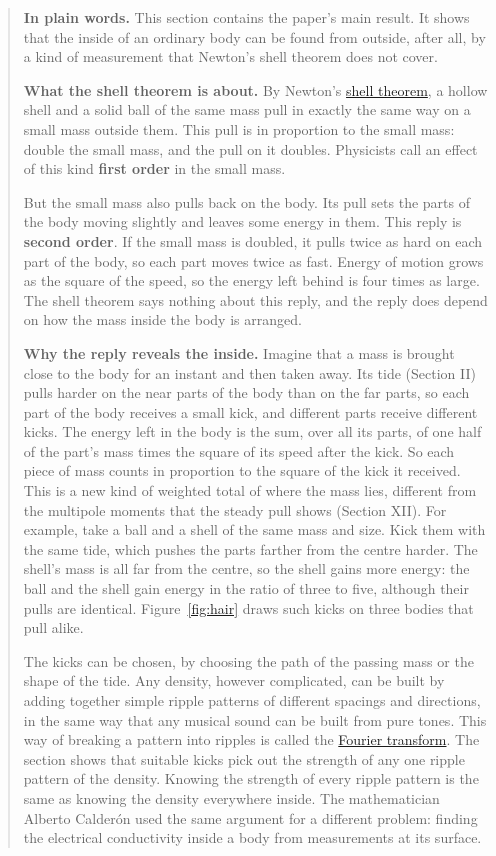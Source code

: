\begin{quote}
\textbf{In plain words.} This section contains the paper's main result. It shows
that the inside of an ordinary body can be found from outside, after all, by a
kind of measurement that Newton's shell theorem does not cover.

\textbf{What the shell theorem is about.} By Newton's
\href{https://en.wikipedia.org/wiki/Shell_theorem}{shell theorem}, a hollow
shell and a solid ball of the same mass pull in exactly the same way on a small
mass outside them. This pull is in proportion to the small mass: double the
small mass, and the pull on it doubles. Physicists call an effect of this kind
\textbf{first order} in the small mass.

But the small mass also pulls back on the body. Its pull sets the parts of the
body moving slightly and leaves some energy in them. This reply is
\textbf{second order}. If the small mass is doubled, it pulls twice as hard on
each part of the body, so each part moves twice as fast. Energy of motion grows
as the square of the speed, so the energy left behind is four times as large.
The shell theorem says nothing about this reply, and the reply does depend on
how the mass inside the body is arranged.

\textbf{Why the reply reveals the inside.} Imagine that a mass is brought close
to the body for an instant and then taken away. Its tide (Section II) pulls
harder on the near parts of the body than on the far parts, so each part of the
body receives a small kick, and different parts receive different kicks. The
energy left in the body is the sum, over all its parts, of one half of the
part's mass times the square of its speed after the kick. So each piece of mass
counts in proportion to the square of the kick it received. This is a new kind
of weighted total of where the mass lies, different from the multipole moments
that the steady pull shows (Section XII). For example, take a ball and a shell
of the same mass and size. Kick them with the same tide, which pushes the parts
farther from the centre harder. The shell's mass is all far from the centre, so
the shell gains more energy: the ball and the shell gain energy in the ratio of
three to five, although their pulls are identical. Figure~\ref{fig:hair} draws such kicks on three bodies that pull alike.

The kicks can be chosen, by choosing the path of the passing mass or the shape
of the tide. Any density, however complicated, can be built by adding together
simple ripple patterns of different spacings and directions, in the same way
that any musical sound can be built from pure tones. This way of breaking a
pattern into ripples is called the
\href{https://en.wikipedia.org/wiki/Fourier_transform}{Fourier transform}. The
section shows that suitable kicks pick out the strength of any one ripple
pattern of the density. Knowing the strength of every ripple pattern is the same
as knowing the density everywhere inside. The mathematician Alberto Calder\'on
used the same argument for a different problem: finding the electrical
conductivity inside a body from measurements at its surface.


\end{quote}
